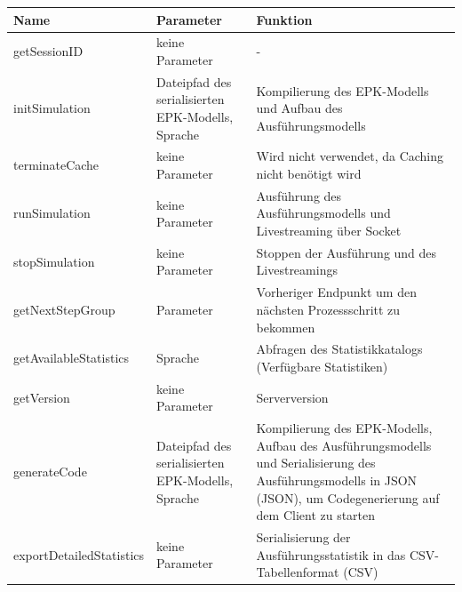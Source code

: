 \label{acro:JSON}\label{acro:CSV}%
\begin{table}[H]
\centering
\footnotesize
\renewcommand{\arraystretch}{0.85}
\begin{tabularx}{\textwidth}{l >{\hsize=0.65\hsize\raggedright\arraybackslash}X >{\hsize=1.35\hsize\raggedright\arraybackslash}X}
\toprule
Name                        &   Parameter                                                           & Funktion \\
\midrule
getSessionID                &   keine Parameter                                                     & -         \\
initSimulation              &   Dateipfad des serialisierten EPK-Modells, Sprache                   & Kompilierung des EPK-Modells und Aufbau des Ausführungsmodells \\
terminateCache              &   keine Parameter                                                     & Wird nicht verwendet, da Caching nicht benötigt wird           \\ 
runSimulation               &   keine Parameter                                                     & Ausführung des Ausführungsmodells und Livestreaming über Socket \\
stopSimulation              &   keine Parameter                                                     & Stoppen der Ausführung und des Livestreamings \\
getNextStepGroup            &   Parameter                                                           & Vorheriger Endpunkt um den nächsten Prozessschritt zu bekommen  \\
getAvailableStatistics      &   Sprache                                                             & Abfragen des Statistikkatalogs (Verfügbare Statistiken)  \\
getVersion                  &   keine Parameter                                                     & Serverversion  \\
generateCode                &   Dateipfad des serialisierten EPK-Modells, Sprache                   & Kompilierung des EPK-Modells, Aufbau des Ausführungsmodells und Serialisierung des Ausführungsmodells in \acl{JSON} (\acs{JSON}), um Codegenerierung auf dem Client zu starten  \\
exportDetailedStatistics    &   keine Parameter                                                     & Serialisierung der Ausführungsstatistik in das \acs{CSV}-Tabellenformat (\acl{CSV})  \\

\end{tabularx}
\end{table}

